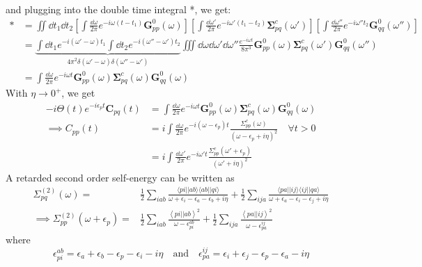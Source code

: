 and plugging into the double time integral *, we get:
\begin{align}
    * &= \iint \dd t_1 \dd t_2 \left[\int \frac{\dd \omega}{2\pi} e^{-i\omega (t-t_1)} \bm{G}_{pp}^{0}(\omega)\right] \left[\int \frac{\dd \omega'}{2\pi} e^{-i\omega' (t_1 - t_2)} \bm{\Sigma}_{pq}^c(\omega')\right] \left[\int \frac{\dd \omega''}{2\pi} e^{-i\omega'' t_2} \bm{G}_{qq}^{0}(\omega'')\right]\\
    &= \underbrace{\int \dd t_1 e^{-i \left(\omega' -\omega\right)t_1} \int \dd t_2 e^{-i \left(\omega'' -\omega'\right)t_2}}_{4\pi^2 \delta(\omega' -\omega)\delta(\omega'' -\omega')} \iiint \dd \omega \dd \omega' \dd \omega'' \frac{e^{-i\omega t}}{8\pi^3} \bm{G}_{pp}^{0}(\omega)\bm{\Sigma}_{pq}^c(\omega')\bm{G}_{qq}^{0}(\omega'')\\
    &= \int \frac{\dd \omega}{2\pi} e^{-i\omega t} \bm{G}_{pp}^{0}(\omega)\bm{\Sigma}_{pq}^c(\omega)\bm{G}_{qq}^{0}(\omega)
\end{align}
With $\eta \to 0^+$, we get
\begin{align}
    -i \Theta(t) e^{-i\epsilon_p t} \bm{C}_{pq}(t) &= \int \frac{\dd \omega}{2\pi} e^{-i\omega t} \bm{G}_{pp}^{0}(\omega)\bm{\Sigma}_{pq}^c(\omega)\bm{G}_{qq}^{0}(\omega) \\
\implies {C}_{pp}(t) &=  i\int \frac{\dd \omega}{2\pi} e^{-i(\omega - \epsilon_p) t} \frac{{\Sigma}_{pp}^c(\omega)}{(\omega - \epsilon_p + i\eta)^2} \quad \forall t>0\\ 
&=  i\int  \frac{\dd \omega'}{2\pi} e^{-i\omega' t} \frac{{\Sigma}_{pp}^c(\omega' + \epsilon_p)}{(\omega' + i\eta)^2} \label{eq:Cpp_0}
\end{align}
A retarded second order self-energy can be written as
\begin{align}
\Sigma_{pq}^{(2)}(\omega) =& \frac{1}{2} \sum_{iab} \frac{\langle pi || ab \rangle \langle ab || qi \rangle}{\omega + \epsilon_i - \epsilon_a - \epsilon_b + i\eta} + \frac{1}{2} \sum_{ija} \frac{\langle pa || ij \rangle \langle ij || qa \rangle}{\omega + \epsilon_a - \epsilon_i - \epsilon_j + i\eta} \\
\implies \Sigma_{pp}^{(2)}(\omega+\epsilon_p) =&
\frac{1}{2} \sum_{iab}
\frac{\left< pi \left| \right| ab \right>^2}
{\omega-\epsilon_{pi}^{ab}} + \frac{1}{2} \sum_{ija}
\frac{\left< pa \left| \right| ij \right>^2}
{\omega-\epsilon_{pa}^{ij}}
\end{align}
where
\begin{equation}
    \epsilon_{pi}^{ab} = \epsilon_{a}+\epsilon_{b}-\epsilon_{p}-\epsilon_{i} - i\eta \quad \text{and} \quad \epsilon_{pa}^{ij} = \epsilon_{i}+\epsilon_{j}-\epsilon_{p}-\epsilon_{a} - i\eta
\end{equation}
